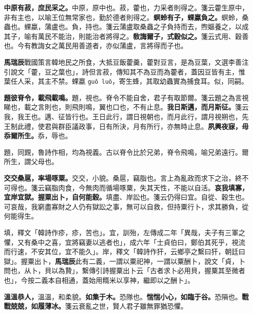 \textbf{中原有菽，庶民采之。}{\footnotesize 中原，原中也。菽，藿也，力采者則得之。箋云藿生原中，非有主也，以喻王位無常家也，勤於德者則得之。}\textbf{螟蛉有子，蜾蠃負之。}{\footnotesize 螟蛉，桑蟲也。蜾蠃，蒲盧也。負，持也。箋云蒲盧取桑蟲之子負持而去，煦嫗養之，以成其子，喻有萬民不能治，則能治者將得之。}\textbf{敎誨爾子，式穀似之。}{\footnotesize 箋云式用、穀善也。今有教誨女之萬民用善道者，亦似蒲盧，言將得而子也。}

\begin{quoting}\textbf{馬瑞辰}戰國策言韓地民之所食，大抵豆飯藿羹，藿對豆言，是為豆葉，文選李善注引說文「藿，豆之葉也」，詩但言菽，傳知其不為豆而為藿者，蓋因豆皆有主，惟葉任人采，其主不禁。蜾蠃 \texttt{guǒ luǒ}，寄生蜂，其取幼蟲實為捕食耳。似，同嗣。\end{quoting}

\textbf{題彼脊令，載飛載鳴。}{\footnotesize 題，視也。脊令不能自舍，君子有取節爾。箋云題之為言視睇也，載之言則也，則飛則鳴，翼也口也，不有止息。}\textbf{我日斯邁，而月斯征。}{\footnotesize 箋云我，我王也。邁、征皆行也。王日此行，謂日視朝也，而月此行，謂月視朔也，先王制此禮，使君與群臣議政事，日有所決，月有所行，亦無時止息。}\textbf{夙興夜寐，毋忝爾所生。}{\footnotesize 忝，辱也。}

\begin{quoting}題，同𧡰，魯詩作相，均為視義。古以脊令比於兄弟，脊令飛鳴，喻兄弟遠行。爾所生，謂父母也。\end{quoting}

\textbf{交交桑扈，率場啄粟。}{\footnotesize 交交，小貌。桑扈，竊脂也。言上為亂政而求下之治，終不可得也。箋云竊脂肉食，今無肉而循場啄粟，失其天性，不能以自活。}\textbf{哀我填寡，宜岸宜獄。握粟出卜，自何能穀。}{\footnotesize 填盡、岸訟也。箋云仍得曰宜。自從、穀生也。可哀哉，我窮盡寡財之人仍有獄訟之事，無可以自救，但持粟行卜，求其勝負，從何能得生。}

\begin{quoting}填，釋文「韓詩作疹，疹，苦也」。宜，訓殆，左傳成二年「異哉，夫子有三軍之懼，又有桑中之喜，宜將竊妻以逃者也」，成六年「士貞伯曰，鄭伯其死乎，視流而行速，不安其位，宜不能久」。岸，釋文「韓詩作犴，云鄉亭之繫曰犴，朝廷曰獄」。握粟出卜，\textbf{馬瑞辰}此有二義，一謂以粟祀神，一謂以粟酬卜，說文「貞，卜問也，从卜，貝以為贄」，繫傳引詩握粟出卜云「古者求卜必用貝，握粟其至微者也」，今按二義本自相通，蓋始用糈米以享神，繼即以之酬卜」。\end{quoting}

\textbf{溫溫恭人，}{\footnotesize 溫溫，和柔貌。}\textbf{如集于木。}{\footnotesize 恐隊也。}\textbf{惴惴小心，如臨于谷。}{\footnotesize 恐隕也。}\textbf{戰戰兢兢，如履薄冰。}{\footnotesize 箋云衰亂之世，賢人君子雖無罪猶恐懼。}

